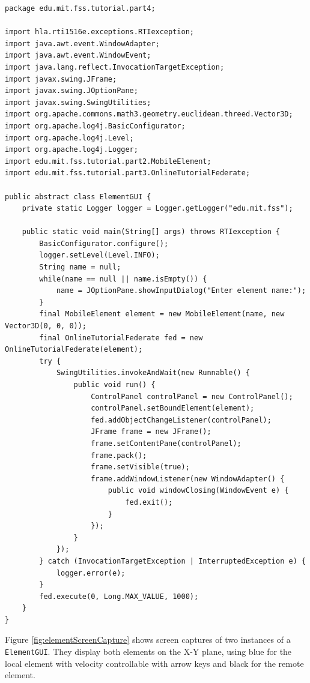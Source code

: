 \documentclass[]{article}
\begin{document}
\begin{Code}
\begin{lstlisting}[caption={ElementGUI object class},label={lst:elementGUI}]
package edu.mit.fss.tutorial.part4;

import hla.rti1516e.exceptions.RTIexception;
import java.awt.event.WindowAdapter;
import java.awt.event.WindowEvent;
import java.lang.reflect.InvocationTargetException;
import javax.swing.JFrame;
import javax.swing.JOptionPane;
import javax.swing.SwingUtilities;
import org.apache.commons.math3.geometry.euclidean.threed.Vector3D;
import org.apache.log4j.BasicConfigurator;
import org.apache.log4j.Level;
import org.apache.log4j.Logger;
import edu.mit.fss.tutorial.part2.MobileElement;
import edu.mit.fss.tutorial.part3.OnlineTutorialFederate;

public abstract class ElementGUI {
	private static Logger logger = Logger.getLogger("edu.mit.fss");
	
	public static void main(String[] args) throws RTIexception {
		BasicConfigurator.configure();
		logger.setLevel(Level.INFO);
		String name = null;
		while(name == null || name.isEmpty()) {
			name = JOptionPane.showInputDialog("Enter element name:");
		}
		final MobileElement element = new MobileElement(name, new Vector3D(0, 0, 0));
		final OnlineTutorialFederate fed = new OnlineTutorialFederate(element);
		try {
			SwingUtilities.invokeAndWait(new Runnable() {
				public void run() {
					ControlPanel controlPanel = new ControlPanel();
					controlPanel.setBoundElement(element);
					fed.addObjectChangeListener(controlPanel);
					JFrame frame = new JFrame();
					frame.setContentPane(controlPanel);
					frame.pack();
					frame.setVisible(true);
					frame.addWindowListener(new WindowAdapter() {
						public void windowClosing(WindowEvent e) {
							fed.exit();
						}
					});
				}
			});
		} catch (InvocationTargetException | InterruptedException e) {
			logger.error(e);
		}
		fed.execute(0, Long.MAX_VALUE, 1000);
	}
}
\end{lstlisting}
\end{Code}

Figure \ref{fig:elementScreenCapture} shows screen captures of two instances of a \texttt{ElementGUI}. They display both elements on the X-Y plane, using blue for the local element with velocity controllable with arrow keys and black for the remote element.
\end{document}
